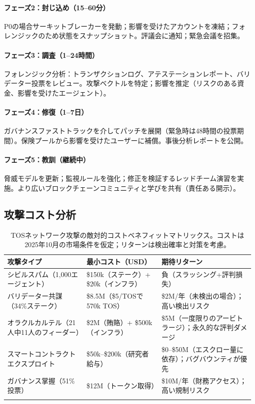\documentclass[11pt]{article}
\begin{document}
\paragraph{フェーズ2：封じ込め（15--60分）}
P0の場合サーキットブレーカーを発動；影響を受けたアカウントを凍結；フォレンジックのため状態をスナップショット。評議会に通知；緊急会議を招集。

\paragraph{フェーズ3：調査（1--24時間）}
フォレンジック分析：トランザクションログ、アテステーションレポート、バリデーター投票をレビュー。攻撃ベクトルを特定；影響を推定（リスクのある資金、影響を受けたエージェント）。

\paragraph{フェーズ4：修復（1--7日）}
ガバナンスファストトラックを介してパッチを展開（緊急時は48時間の投票期間）。保険プールから影響を受けたユーザーに補償。事後分析レポートを公開。

\paragraph{フェーズ5：教訓（継続中）}
脅威モデルを更新；監視ルールを強化；修正を検証するレッドチーム演習を実施。より広いブロックチェーンコミュニティと学びを共有（責任ある開示）。

\subsection{攻撃コスト分析}

\begin{longtable}{@{}p{}p{}p{}@{}}
\toprule
\textbf{攻撃タイプ} & \textbf{最小コスト（USD）} & \textbf{期待リターン} \\\midrule
シビルスパム（1,000エージェント） & \$150k（ステーク）+ \$20k（インフラ） & 負（スラッシング+評判損失） \\
バリデーター共謀（34\%ステーク） & \$8.5M（\$5/TOSで570k TOS） & \$2M/年（未検出の場合）；高い検出リスク \\
オラクルカルテル（21人中11人のフィーダー） & \$2M（賄賂）+ \$500k（インフラ） & \$5M（一度限りのアービトラージ）；永久的な評判ダメージ \\
スマートコントラクトエクスプロイト & \$50k--\$200k（研究者給与） & \$0--\$50M（エスクロー量に依存）；バグバウンティが優先 \\
ガバナンス掌握（51\%投票） & \$12M（トークン取得） & \$10M/年（財務アクセス）；高い規制リスク \\
\bottomrule
\caption{TOSネットワーク攻撃の敵対的コストベネフィットマトリックス。コストは2025年10月の市場条件を仮定；リターンは検出確率と対策を考慮。}
\end{longtable}
\end{document}
